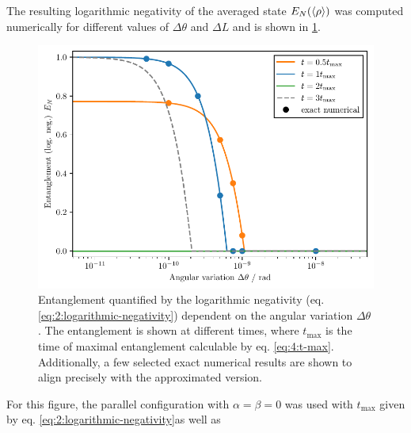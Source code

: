 The resulting logarithmic negativity of the averaged state $E_N(\left\langle\rho\right\rangle)$ was computed numerically for different values of $\Delta \theta$ and $\Delta L$ and is shown in \cref{fig:4:EN-delta-theta}.
\begin{figure}[!htbp]
  \centering
  \includegraphics[width=\textwidth]{./../figures/theta-variance/EN-delta-theta.pdf}
  \caption{Entanglement quantified by the logarithmic negativity (eq. \eqref{eq:2:logarithmic-negativity}) dependent on the angular variation $\Delta\theta$. The entanglement is shown at different times, where $t_\mathrm{max}$ is the time of maximal entanglement calculable by eq. \eqref{eq:4:t-max}. Additionally, a few selected exact numerical results are shown to align precisely with the approximated version.}
  \label{fig:4:EN-delta-theta}
\end{figure}
For this figure, the parallel configuration with $\alpha = \beta = 0$ was used with $t_\mathrm{max}$ given by eq. \eqref{eq:2:logarithmic-negativity}as well as 
